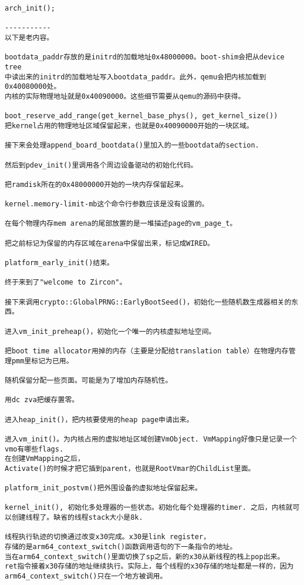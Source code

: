 \begin{verbatim}
arch_init();

-----------
以下是老内容。

bootdata_paddr存放的是initrd的加载地址0x48000000。boot-shim会把从device tree
中读出来的initrd的加载地址写入bootdata_paddr。此外，qemu会把内核加载到0x40080000处。
内核的实际物理地址就是0x40090000。这些细节需要从qemu的源码中获得。

boot_reserve_add_range(get_kernel_base_phys(), get_kernel_size())
把kernel占用的物理地址区域保留起来，也就是0x40090000开始的一块区域。

接下来会处理append_board_bootdata()里加入的一些bootdata的section.

然后到pdev_init()里调用各个周边设备驱动的初始化代码。

把ramdisk所在的0x48000000开始的一块内存保留起来。

kernel.memory-limit-mb这个命令行参数应该是没有设置的。

在每个物理内存mem arena的尾部放置的是一堆描述page的vm_page_t。

把之前标记为保留的内存区域在arena中保留出来，标记成WIRED。

platform_early_init()结束。

终于来到了"welcome to Zircon"。

接下来调用crypto::GlobalPRNG::EarlyBootSeed()，初始化一些随机数生成器相关的东西。

进入vm_init_preheap()，初始化一个唯一的内核虚拟地址空间。

把boot time allocator用掉的内存（主要是分配给translation table）在物理内存管理pmm里标记为已用。

随机保留分配一些页面。可能是为了增加内存随机性。

用dc zva把缓存置零。

进入heap_init()，把内核要使用的heap page申请出来。

进入vm_init()。为内核占用的虚拟地址区域创建VmObject. VmMapping好像只是记录一个vmo有哪些flags. 
在创建VmMapping之后，
Activate()的时候才把它插到parent，也就是RootVmar的ChildList里面。

platform_init_postvm()把外围设备的虚拟地址保留起来。

kernel_init(), 初始化多处理器的一些状态。初始化每个处理器的timer. 之后，内核就可以创建线程了。缺省的线程stack大小是8k.

线程执行轨迹的切换通过改变x30完成。x30是link register，
存储的是arm64_context_switch()函数调用语句的下一条指令的地址。
当在arm64_context_switch()里面切换了sp之后，新的x30从新线程的栈上pop出来。
ret指令接着x30存储的地址继续执行。实际上，每个线程的x30存储的地址都是一样的，因为
arm64_context_switch()只在一个地方被调用。


\end{verbatim}
